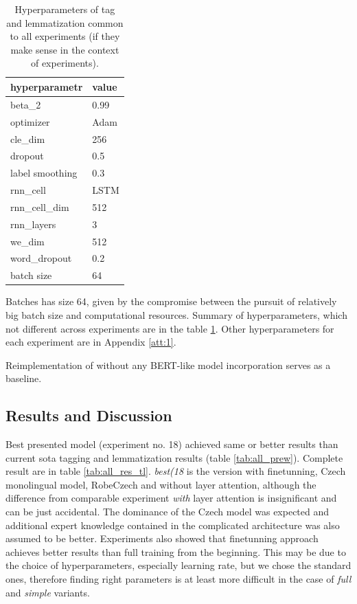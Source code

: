  \begin{table}[!h]
 \centering
\begin{tabular}{|l||l|}
\hline
hyperparametr   & \multicolumn{1}{l|}{value} \\ \hline \hline
beta\_2          & 0.99                       \\ \hline
optimizer       & Adam                       \\ \hline
cle\_dim         & 256                        \\ \hline
dropout         & 0.5                        \\ \hline
label smoothing & 0.3                        \\ \hline
rnn\_cell        & LSTM                       \\ \hline
rnn\_cell\_dim    & 512                        \\ \hline
rnn\_layers      & 3                          \\ \hline
we\_dim          & 512                        \\ \hline
word\_dropout    & 0.2                        \\ \hline
batch size & 64 \\ \hline
\end{tabular}
\caption{Hyperparameters of tag and lemmatization common to all experiments (if they make sense in the context of experiments).}
\label{tab:hyp_all}
\end{table}
Batches has size 64, given by the compromise between the pursuit of relatively big batch size and computational resources. Summary of hyperparameters, which not different across experiments are in the table \ref{tab:hyp_all}. Other hyperparameters for each experiment are in Appendix \ref{att:1}.
\par 
Reimplementation of \citep{Straka2019c} without any BERT-like model incorporation serves as a baseline.

\subsection{Results and Discussion}
Best presented model (experiment no. 18) achieved same or better results than current \acrlong{sota} tagging and lemmatization results (table \ref{tab:all_prew}). Complete result are in table \ref{tab:all_res_tl}. \textit{best(18} is the version with finetunning, Czech monolingual model, RobeCzech and without layer attention, although the difference from comparable experiment \textit{with} layer attention is insignificant and can be just accidental. The dominance of the Czech model was expected and additional expert knowledge contained in the complicated architecture was also assumed to be better. Experiments also showed that finetunning approach achieves better results than full training from the beginning. This may be due to the choice of hyperparameters, especially learning rate, but  we chose the standard ones, therefore finding right parameters is at least more difficult in the case of \textit{full} and \textit{simple} variants.  %


